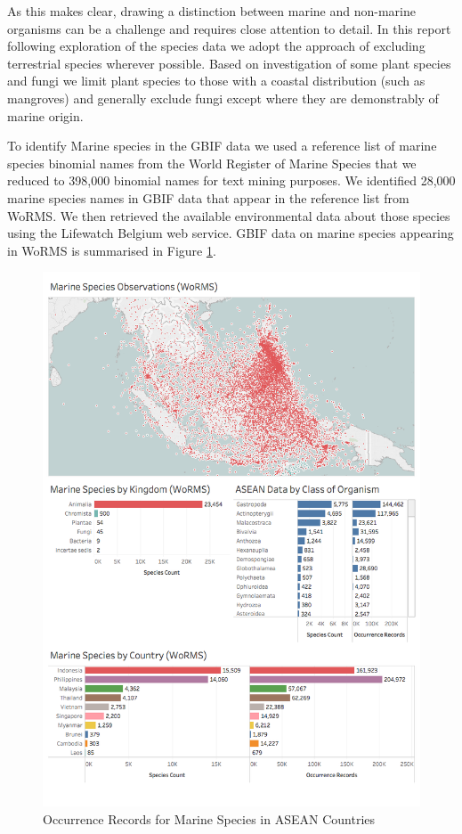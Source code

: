 \documentclass[]{book}
\theoremstyle{definition}
\theoremstyle{definition}
\theoremstyle{definition}
\theoremstyle{remark}
\begin{document}
As this makes clear, drawing a distinction between marine and non-marine
organisms can be a challenge and requires close attention to detail. In
this report following exploration of the species data we adopt the
approach of excluding terrestrial species wherever possible. Based on
investigation of some plant species and fungi we limit plant species to
those with a coastal distribution (such as mangroves) and generally
exclude fungi except where they are demonstrably of marine origin.

To identify Marine species in the GBIF data we used a reference list of
marine species binomial names from the World Register of Marine Species
that we reduced to 398,000 binomial names for text mining purposes. We
identified 28,000 marine species names in GBIF data that appear in the
reference list from WoRMS. We then retrieved the available environmental
data about those species using the Lifewatch Belgium web service. GBIF
data on marine species appearing in WoRMS is summarised in Figure
\ref{fig:marine}.

\begin{figure}

{\centering \includegraphics[width=1\linewidth]{images/asean_marine_biodiversity} 

}

\caption{Occurrence Records for Marine Species in ASEAN Countries}\label{fig:marine}
\end{figure}
\end{document}
